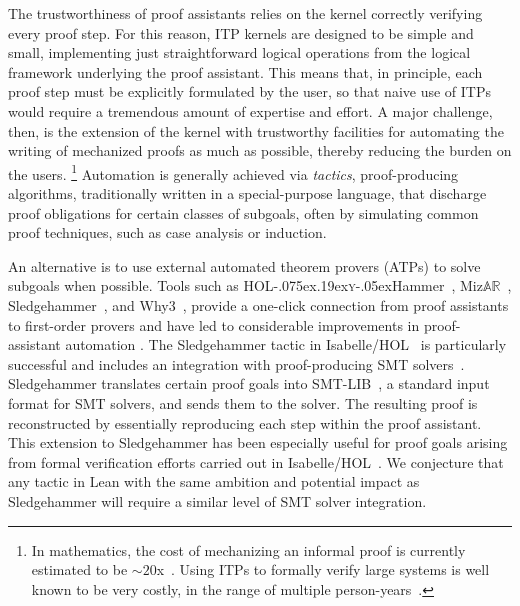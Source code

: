 \documentclass[runningheads]{llncs}
\newcommand\HOLyHammer{HOL\kern-.075ex\raise.19ex\hbox{\textsc{y}}\kern-.05ex\-Hammer}
\begin{document}
The trustworthiness of proof assistants relies on the kernel correctly verifying
every proof step.  For this reason, ITP kernels are designed to be simple and
small, implementing just
straightforward logical operations from the logical framework underlying the proof
assistant.
%
This means that, in principle, each proof step must be explicitly formulated by
the user, so that naive use of ITPs would require a tremendous amount of
expertise and effort.
A major challenge, then, is the extension of the kernel with trustworthy
facilities for automating the
writing of mechanized proofs as much as possible, thereby reducing the burden on the users.%
\footnote{In mathematics, the cost of mechanizing an informal
  proof is currently estimated to be $\sim 20$x~\cite{Tao2025}.
  Using ITPs to formally verify large systems is well known to be very costly,
  in the range of multiple person-years~\cite{Klein2010}.  }
%
%
Automation is generally achieved via \emph{tactics}, proof-producing
algorithms, traditionally written in a special-purpose language, that
discharge proof obligations for certain classes of subgoals, often by
simulating common proof techniques, such as case analysis or induction.
%

An alternative is
to use external automated theorem provers (ATPs) to solve subgoals
when possible.
%
Tools such as \HOLyHammer~\cite{Kaliszy2015},
Miz$\mathbb{AR}$~\cite{Jakubuv2023},
Sledgehammer~\cite{DBLP:journals/iandc/MengQP06}, and Why3~\cite{Bobot2011},
provide a one-click connection from proof assistants to first-order provers and
have led to considerable improvements in proof-assistant
automation \cite{Blanchette2016-qed}.
%
The Sledgehammer tactic in Isabelle/HOL~\cite{Nipkow2002} is particularly
successful and includes an integration with
proof-producing SMT
solvers~\cite{DBLP:conf/cade/BlanchetteBP11,DBLP:conf/cade/SchurrFD21}.  Sledgehammer
translates certain proof goals into SMT-LIB~\cite{Barrett2017}, a standard
input format for SMT solvers, and sends them to the solver.  The resulting proof
is reconstructed by essentially reproducing each step within the proof assistant.
%
This extension
to Sledgehammer has been especially useful for proof goals arising from
formal verification efforts carried out in
Isabelle/HOL~\cite{DBLP:conf/cade/BlanchetteBP11}.
We conjecture that any tactic in Lean with the same ambition and potential impact
as Sledgehammer will require a similar level of SMT solver integration.
%
\end{document}
